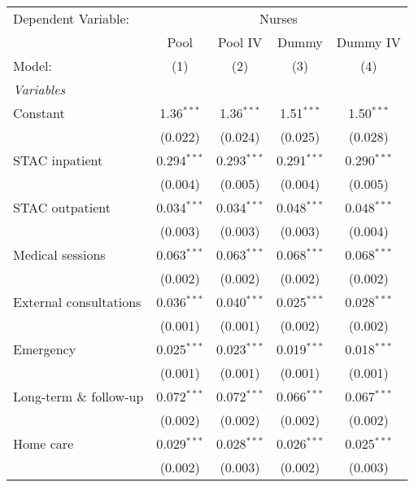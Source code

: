 
\begingroup
\centering
\begin{tabular}{lcccc}
   \tabularnewline \midrule \midrule
   Dependent Variable: & \multicolumn{4}{c}{Nurses}\\
                           & Pool          & Pool IV       & Dummy          & Dummy IV \\   
   Model:                  & (1)           & (2)           & (3)            & (4)\\  
   \midrule
   \emph{Variables}\\
   Constant                & 1.36$^{***}$  & 1.36$^{***}$  & 1.51$^{***}$   & 1.50$^{***}$\\   
                           & (0.022)       & (0.024)       & (0.025)        & (0.028)\\   
   STAC inpatient          & 0.294$^{***}$ & 0.293$^{***}$ & 0.291$^{***}$  & 0.290$^{***}$\\   
                           & (0.004)       & (0.005)       & (0.004)        & (0.005)\\   
   STAC outpatient         & 0.034$^{***}$ & 0.034$^{***}$ & 0.048$^{***}$  & 0.048$^{***}$\\   
                           & (0.003)       & (0.003)       & (0.003)        & (0.004)\\   
   Medical sessions        & 0.063$^{***}$ & 0.063$^{***}$ & 0.068$^{***}$  & 0.068$^{***}$\\   
                           & (0.002)       & (0.002)       & (0.002)        & (0.002)\\   
   External consultations  & 0.036$^{***}$ & 0.040$^{***}$ & 0.025$^{***}$  & 0.028$^{***}$\\   
                           & (0.001)       & (0.001)       & (0.002)        & (0.002)\\   
   Emergency               & 0.025$^{***}$ & 0.023$^{***}$ & 0.019$^{***}$  & 0.018$^{***}$\\   
                           & (0.001)       & (0.001)       & (0.001)        & (0.001)\\   
   Long-term \& follow-up  & 0.072$^{***}$ & 0.072$^{***}$ & 0.066$^{***}$  & 0.067$^{***}$\\   
                           & (0.002)       & (0.002)       & (0.002)        & (0.002)\\   
   Home care               & 0.029$^{***}$ & 0.028$^{***}$ & 0.026$^{***}$  & 0.025$^{***}$\\   
                           & (0.002)       & (0.003)       & (0.002)        & (0.003)\\   

\end{tabular}
